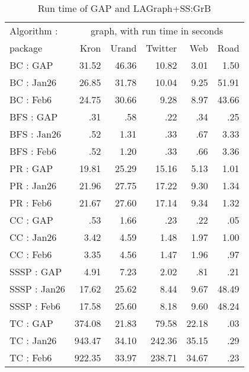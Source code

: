 \begin{table}
\begin{center}
\begin{tabular}{|l|rrrrr|}
\hline
Algorithm :    &   \multicolumn{5}{c|}{graph, with run time in seconds}  \\
 package       &   Kron    &   Urand   &   Twitter  &  Web    &    Road  \\
\hline
BC   : GAP     &  31.52    &  46.36    &  10.82     &  3.01   &    1.50  \\
BC   : Jan26   &  26.85    &  31.78    &  10.04     &  9.25   &   51.91  \\
BC   : Feb6    &  24.75    &  30.66    &   9.28     &  8.97   &   43.66  \\
\hline
BFS  : GAP     &    .31    &    .58    &    .22     &   .34   &     .25  \\
BFS  : Jan26   &    .52    &   1.31    &    .33     &   .67   &    3.33  \\
BFS  : Feb6    &    .52    &   1.20    &    .33     &   .66   &    3.36  \\
\hline
PR   : GAP     &  19.81    &  25.29    &  15.16     &  5.13   &    1.01  \\
PR   : Jan26   &  21.96    &  27.75    &  17.22     &  9.30   &    1.34  \\
PR   : Feb6    &  21.67    &  27.60    &  17.14     &  9.34   &    1.32  \\
\hline
CC   : GAP     &    .53    &   1.66    &    .23     &   .22   &     .05  \\
CC   : Jan26   &   3.42    &   4.59    &   1.48     &  1.97   &    1.00  \\
CC   : Feb6    &   3.35    &   4.56    &   1.47     &  1.96   &     .97  \\
\hline
SSSP : GAP     &   4.91    &   7.23    &   2.02     &   .81   &     .21  \\
SSSP : Jan26   &  17.62    &  25.62    &   8.44     &  9.67   &   48.49  \\
SSSP : Feb6    &  17.58    &  25.60    &   8.18     &  9.60   &   48.24  \\
\hline
TC   : GAP     & 374.08    &  21.83    &  79.58     & 22.18   &     .03  \\
TC   : Jan26   & 943.47    &  34.10    & 242.36     & 35.15   &     .29  \\
TC   : Feb6    & 922.35    &  33.97    & 238.71     & 34.67   &     .23  \\
\hline
\end{tabular}
\caption{Run time of GAP and LAGraph+SS:GrB
\label{table:results}}
\end{center}
\end{table}

